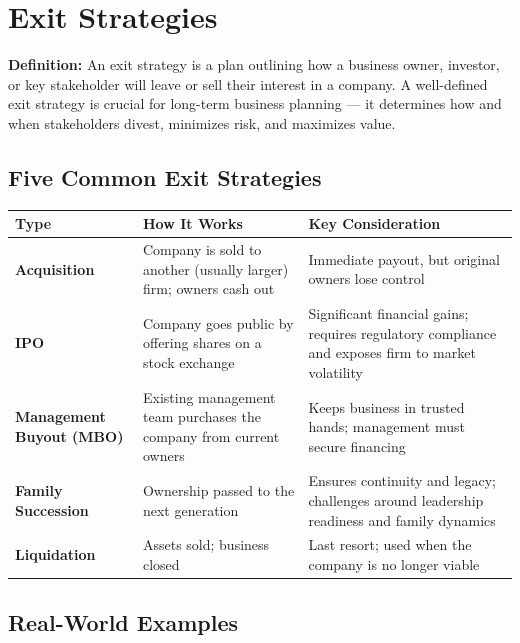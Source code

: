 \documentclass[11pt, letterpaper]{article}
\begin{document}
\newpage

\section{Exit Strategies}

\begin{defbox}
\textbf{Definition:} An exit strategy is a plan outlining how a business owner, investor, or key stakeholder will leave or sell their interest in a company. A well-defined exit strategy is crucial for long-term business planning --- it determines how and when stakeholders divest, minimizes risk, and maximizes value.
\end{defbox}

\subsection{Five Common Exit Strategies}

\begin{center}
\begin{tabular}{>{\bfseries}p{3cm} p{5cm} p{5cm}}
\toprule
Type & How It Works & Key Consideration \\
\midrule
Acquisition & Company is sold to another (usually larger) firm; owners cash out & Immediate payout, but original owners lose control \\
\addlinespace
IPO & Company goes public by offering shares on a stock exchange & Significant financial gains; requires regulatory compliance and exposes firm to market volatility \\
\addlinespace
Management Buyout (MBO) & Existing management team purchases the company from current owners & Keeps business in trusted hands; management must secure financing \\
\addlinespace
Family Succession & Ownership passed to the next generation & Ensures continuity and legacy; challenges around leadership readiness and family dynamics \\
\addlinespace
Liquidation & Assets sold; business closed & Last resort; used when the company is no longer viable \\
\bottomrule
\end{tabular}
\end{center}

\subsection{Real-World Examples}
\end{document}
